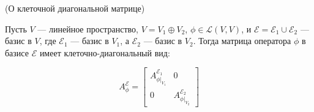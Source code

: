\begin{shlem}
    \begin{lemma} (О клеточной диагональной матрице)
    \leavevmode \nl 
    
 Пусть \( V \) — линейное пространство, \( V = V_{1} \oplus V_{2} \), \; \( \phi \in \mathcal{L}(V, V) \), и \( \mathcal{E} = \mathcal{E}_{1} \cup \mathcal{E}_{2} \) — базис в \( V \), где \( \mathcal{E}_{1} \) — базис в \( V_{1} \), а \( \mathcal{E}_{2} \) — базис в \( V_{2} \). \nl 
 Тогда матрица оператора \( \phi \) в базисе \( \mathcal{E} \) имеет клеточно-диагональный вид:

\[
A_{\phi}^{\mathcal{E}} = \begin{bmatrix}
A_{\phi|_{V_{1}}}^{\mathcal{E}_{1}} & 0 \\
0 & A_{\phi|_{V_{2}}}^{\mathcal{E}_{2}}
\end{bmatrix}
\]
    \end{lemma}
\end{shlem}


